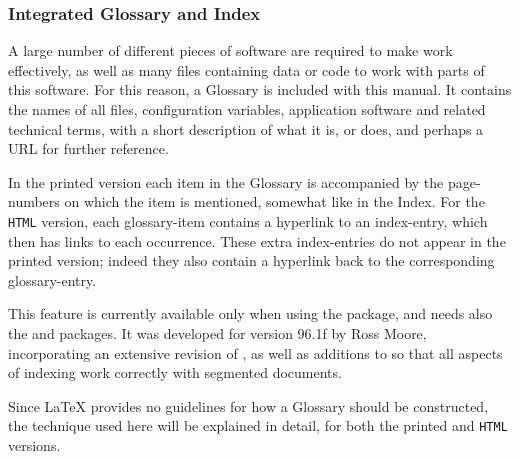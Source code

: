 


\subsubsection{Integrated Glossary and Index\label{glossind}}%
%
%

\noindent
A large number of different pieces of software are required to make
\latextohtml{} work effectively, as well as many files containing data or code 
to work with parts of this software. 
For this reason, a Glossary is included with this manual. 
It contains the names of all files, configuration variables, application software
and related technical terms, with a short description of what it is, or does,
and perhaps a URL for further reference. 

%
\html{\\}%
In the printed version each item in the Glossary is accompanied by the page-numbers
on which the item is mentioned, somewhat like in the Index. 
For the \texttt{HTML} version, each glossary-item contains a hyperlink to an
index-entry, which then has links to each occurrence.
These extra index-entries do not appear in the printed version; 
indeed they also contain a hyperlink back to the corresponding glossary-entry. 

This feature is currently available only when using the  package,
and needs also the  and  packages.
It was developed for version 96.1f by Ross Moore,
incorporating an extensive revision of , as well as additions to
\latextohtml{} so that all aspects of indexing work correctly with segmented documents.

\bigskip
\noindent
Since \LaTeX{} provides no guidelines for how a Glossary should be constructed,
the technique used here will be explained in detail, for both the printed and
\texttt{HTML} versions. 

